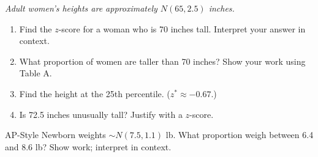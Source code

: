\documentclass[aspectratio=169, 11pt]{beamer}
\begin{document}
{
\begin{frame}[t, plain]
  \vspace{1em}%
  \hspace{0.55cm}%
  \begin{minipage}{0.9\textwidth}
    \small
    \textit{Adult women's heights are approximately $N(65, 2.5)$ inches.}

    \vspace{0.5em}
    \begin{enumerate}
      \setlength{\itemsep}{0.7em}\setlength{\topsep}{0em}
      \item Find the $z$-score for a woman who is 70 inches tall.
            Interpret your answer in context.
      \item What proportion of women are taller than 70 inches?
            Show your work using Table A.
      \item Find the height at the 25th percentile.
            ($z^* \approx -0.67$.)
      \item Is 72.5 inches unusually tall? Justify with a $z$-score.
    \end{enumerate}

    \vspace{0.5em}
    \begin{block}{AP-Style}
      \small
      Newborn weights $\sim N(7.5, 1.1)$ lb. What proportion weigh between
      6.4 and 8.6 lb? Show work; interpret in context.
    \end{block}
  \end{minipage}
\end{frame}
}
\end{document}
